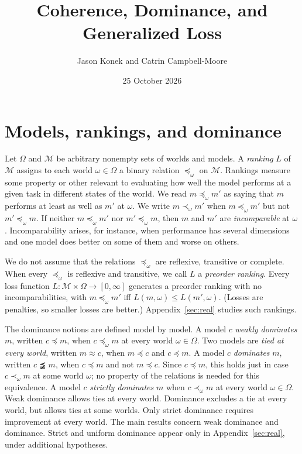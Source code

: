 \documentclass[11pt]{article}
\title{Coherence, Dominance, and Generalized Loss}
\author{Jason Konek and Catrin Campbell-Moore}
\date{25 October 2026}
\theoremstyle{definition}
\theoremstyle{remark}
\newcommand{\M}{\mathcal M}
\begin{document}
\maketitle

\section{Models, rankings, and dominance}\label{sec:setting}
Let $\Omega$ and $\M$ be arbitrary nonempty sets of worlds and models. A \emph{ranking} $L$ of $\M$ assigns to each world $\omega\in\Omega$ a binary relation $\preceq_\omega$ on $\M$. Rankings measure some property or other relevant to evaluating how well the model performs at a given task in different states of the world. We read $m\preceq_\omega m'$ as saying that $m$ performs at least as well as $m'$ at $\omega$. We write $m\prec_\omega m'$ when $m\preceq_\omega m'$ but not $m'\preceq_\omega m$. If neither $m\preceq_\omega m'$ nor $m'\preceq_\omega m$, then $m$ and $m'$ are \emph{incomparable} at $\omega$. Incomparability arises, for instance, when performance has several dimensions and one model does better on some of them and worse on others.

We do not assume that the relations $\preceq_\omega$ are reflexive, transitive or complete. When every $\preceq_\omega$ is reflexive and transitive, we call $L$ a \emph{preorder ranking}. Every loss function $L:\M\times\Omega\to[0,\infty]$ generates a preorder ranking with no incomparabilities, with $m\preceq_\omega m'$ iff $L(m,\omega)\le L(m',\omega)$. (Losses are penalties, so smaller losses are better.) Appendix~\ref{sec:real} studies such rankings.

The dominance notions are defined model by model. A model $c$ \emph{weakly dominates} $m$, written $c\preceq m$, when $c\preceq_\omega m$ at every world $\omega\in\Omega$. Two models are \emph{tied at every world}, written $m\approx c$, when $m\preceq c$ and $c\preceq m$. A model $c$ \emph{dominates} $m$, written $c\precneqq m$, when $c\preceq m$ and not $m\preceq c$. Since $c\preceq m$, this holds just in case $c\prec_\omega m$ at some world $\omega$; no property of the relations is needed for this equivalence. A model $c$ \emph{strictly dominates} $m$ when $c\prec_\omega m$ at every world $\omega\in\Omega$. Weak dominance allows ties at every world. Dominance excludes a tie at every world, but allows ties at some worlds. Only strict dominance requires improvement at every world. The main results concern weak dominance and dominance. Strict and uniform dominance appear only in Appendix~\ref{sec:real}, under additional hypotheses.
\end{document}
